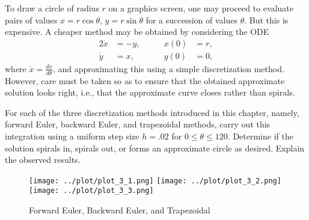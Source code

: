 \begin{problem}[A\&P 3.2]
  To draw a circle of radius $r$ on a graphics screen, one may proceed to evaluate pairs of values $x = r \cos \theta$, $y = r \sin \theta$ for a succession of values $\theta$. But this is expensive. A cheaper method may be obtained by considering the ODE
  \begin{alignat*}{2}
    \dot{x} &= -y, \quad&\quad x(0) &= r, \\
    \dot{y} &= x,  \quad&\quad y(0) &= 0, 
  \end{alignat*}
  where $\dot{x} = \frac{dx}{d\theta}$, and approximating this using a simple discretization method. However, care must be taken so as to ensure that the obtained approximate solution looks right, i.e., that the approximate curve closes rather than spirals.
  
  For each of the three discretization methods introduced in this chapter, namely, forward Euler, backward Euler, and trapezoidal methods, carry out this integration using a uniform step size $h = .02$ for $0 \leq \theta \leq 120$. Determine if the solution spirals in, spirals out, or forms an approximate circle as desired. Explain the observed results.
\end{problem}

\begin{solution}
  \begin{figure}[!ht]
    \centering
    \texttt{[image: ../plot/plot\_3\_1.png]}
    \texttt{[image: ../plot/plot\_3\_2.png]}
    \texttt{[image: ../plot/plot\_3\_3.png]}
    \caption{Forward Euler, Backward Euler, and Trapezoidal}
    \label{fig:prob3}
  \end{figure}
\end{solution}